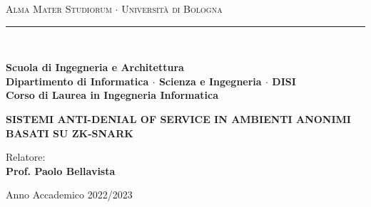 \documentclass[12pt,a4paper]{report}
\begin{document}
\begin{titlepage}

\begin{center}
{{\Large{\textsc{Alma Mater Studiorum $\cdot$ Università di Bologna}}}} 
\rule[0.1cm]{15.8cm}{0.1mm}
\\\vspace{3mm}

{\small{\bf Scuola di Ingegneria e Architettura \\ 
Dipartimento di Informatica $\cdot$ Scienza e Ingegneria $\cdot$ DISI\\
Corso di Laurea in Ingegneria Informatica}}


\end{center}

\vspace{23mm}

\begin{center}{
\large \bf SISTEMI ANTI-DENIAL OF SERVICE IN AMBIENTI ANONIMI BASATI SU ZK-SNARK\par
}\end{center}

\vspace{40mm} \par \noindent

\begin{minipage}[t]{0.47\textwidth}{
    \large{
        Relatore:
        \vspace{2mm}\\{
            \bf Prof. Paolo Bellavista
        }
    }
}
\end{minipage}
%
\hfill
%
\begin{minipage}[t]{0.47\textwidth}
\end{minipage}

\vspace{40mm}

\begin{center}
Anno Accademico 2022/2023
\end{center}

\end{titlepage}
\end{document}
